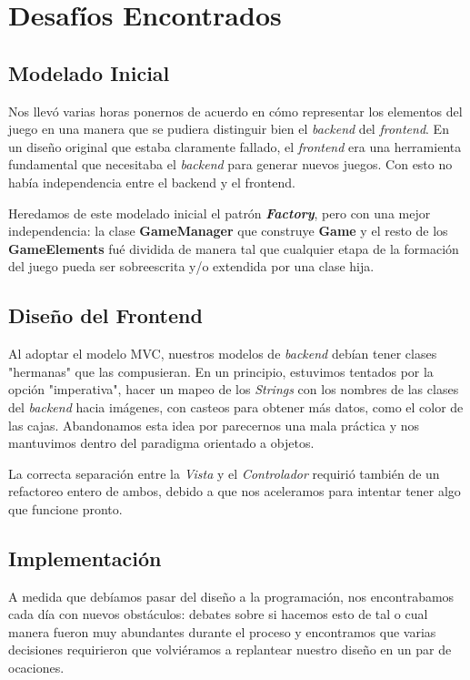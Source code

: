\documentclass[a4paper,12pt,titlepage]{article}
\begin{document}
\section{Desafíos Encontrados}

\subsection{Modelado Inicial}

Nos llevó varias horas ponernos de acuerdo en cómo representar los elementos del juego en una manera que se pudiera distinguir bien el \emph{backend} del \emph{frontend}. En un diseño original que estaba claramente fallado, el \emph{frontend} era una herramienta fundamental que necesitaba el \emph{backend} para generar nuevos juegos. Con esto no había independencia entre el backend y el frontend.

Heredamos de este modelado inicial el patrón \emph{\textbf{Factory}}, pero con una mejor independencia: la clase \textbf{GameManager} que construye \textbf{Game} y el resto de los \textbf{GameElements} fué dividida de manera tal que cualquier etapa de la formación del juego pueda ser sobreescrita y/o extendida por una clase hija.

\subsection{Diseño del Frontend}

Al adoptar el modelo MVC, nuestros modelos de \emph{backend} debían tener clases "hermanas" que las compusieran. En un principio, estuvimos tentados por la opción "imperativa", hacer un mapeo de los \emph{Strings} con los nombres de las clases del \emph{backend} hacia imágenes, con casteos para obtener más datos, como el color de las cajas. Abandonamos esta idea por parecernos una mala práctica y nos mantuvimos dentro del paradigma orientado a objetos.

La correcta separación entre la \emph{Vista} y el \emph{Controlador} requirió también de un refactoreo entero de ambos, debido a que nos aceleramos para intentar tener algo que funcione pronto.

\subsection{Implementación}

A medida que debíamos pasar del diseño a la programación, nos encontrabamos cada día con nuevos obstáculos: debates sobre si hacemos esto de tal o cual manera fueron muy abundantes durante el proceso y encontramos que varias decisiones requirieron que volviéramos a replantear nuestro diseño en un par de ocaciones.
\end{document}

